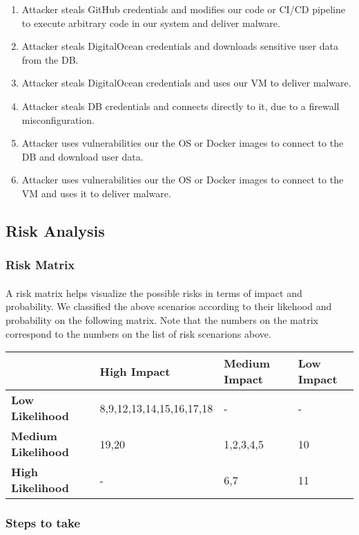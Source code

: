 \begin{enumerate}
	\item Attacker steals GitHub credentials and modifies our code or CI/CD pipeline to execute arbitrary code in our system and deliver malware.
	\item Attacker steals DigitalOcean credentials and downloads sensitive user data from the DB.
	\item Attacker steals DigitalOcean credentials and uses our VM to deliver malware.
	\item Attacker steals DB credentials and connects directly to it, due to a firewall misconfiguration.
	\item Attacker uses vulnerabilities our the OS or Docker images to connect to the DB and download user data.
	\item Attacker uses vulnerabilities our the OS or Docker images to connect to the VM and uses it to deliver malware.
\end{enumerate}

\subsection{Risk Analysis}
\subsubsection{Risk Matrix}
\paragraph{} A risk matrix helps visualize the possible risks in terms of impact and probability. We classified the above scenarios according to their likehood and probability on the following matrix. Note that the numbers on the matrix correspond to the numbers on the list of risk scenarions above. \\
\begin{tabular}{|l|l|l|l|}
	\hline
	& \textbf{High Impact} & \textbf{Medium Impact} & \textbf{Low Impact} \\ \hline
	\textbf{Low Likelihood} & 8,9,12,13,14,15,16,17,18 & - & - \\ \hline
	\textbf{Medium Likelihood} & 19,20 & 1,2,3,4,5 & 10 \\ \hline
	\textbf{High Likelihood} & - & 6,7 & 11 \\ \hline
\end{tabular}

\subsubsection{Steps to take}
